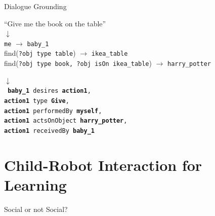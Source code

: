 \documentclass[compress]{beamer}
\begin{document}
{


\begin{frame}{Dialogue Grounding}
    \centering

    \vspace*{2em}
    ``Give me the book on the table''\\

     {
        $\downarrow$\\
    {\tt me} $\rightarrow$ {\tt baby\_1} \\
    find({\tt\scriptsize ?obj type table}) $\rightarrow$ {\tt ikea\_table} \\
    find({\tt\scriptsize ?obj type book, ?obj isOn ikea\_table}) $\rightarrow$ {\tt harry\_potter} \\
}

     {
        $\downarrow$\\
        { \tt
            \textbf{baby\_1} desires \textbf{action1}, \\
            \textbf{action1} type \textbf{Give}, \\
            \textbf{action1} performedBy \textbf{myself}, \\
            \textbf{action1} actsOnObject \textbf{harry\_potter}, \\
            \textbf{action1} receivedBy \textbf{baby\_1} \\
        }
    }
\end{frame}
}


 \section[CRI for Learning]{Child-Robot Interaction for Learning}


 \begin{frame}{Social or not Social?}
     \begin{center}
     \end{center}
 \end{frame}
\end{document}
